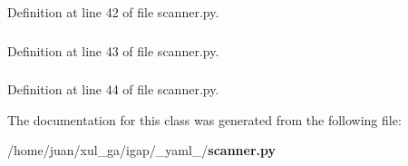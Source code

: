 Definition at line 42 of file scanner.py.
\subsubsection{}\label{class__yaml___1_1scanner_1_1SimpleKey_fa9e9ca54ad7e289e79a10420854a7f3}




Definition at line 43 of file scanner.py.
\subsubsection{}\label{class__yaml___1_1scanner_1_1SimpleKey_54346e4b6411bb2585c624a22640ed6d}




Definition at line 44 of file scanner.py.

The documentation for this class was generated from the following file:\begin{CompactItemize}
\item 
/home/juan/xul\_\-ga/igap/\_\-yaml\_\-/{\bf scanner.py}\end{CompactItemize}
